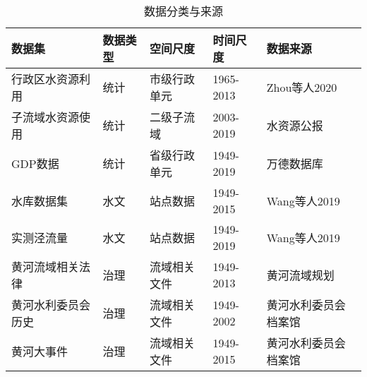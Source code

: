 \begin{table}[htbp]
    \centering
    \caption{数据分类与来源}
      \begin{tabularx}{\textwidth}{LLLLL}
      \toprule
      数据集   & 数据类型  & 空间尺度  & 时间尺度  & 数据来源 \\
      \midrule
      行政区水资源利用 & 统计    & 市级行政单元 & 1965-2013 & Zhou等人2020 \\
      子流域水资源使用 & 统计    & 二级子流域 & 2003-2019 & 水资源公报 \\
      GDP数据 & 统计    & 省级行政单元 & 1949-2019 & 万德数据库 \\
      水库数据集 & 水文    & 站点数据  & 1949-2015 & Wang等人2019 \\
      实测泾流量 & 水文    & 站点数据  & 1949-2019 & Wang等人2019 \\
      黄河流域相关法律 & 治理    & 流域相关文件 & 1949-2013 & 黄河流域规划 \\
      黄河水利委员会历史 & 治理    & 流域相关文件 & 1949-2002 & 黄河水利委员会档案馆 \\
      黄河大事件 & 治理    & 流域相关文件 & 1949-2015 & 黄河水利委员会档案馆 \\
      \bottomrule
      \end{tabularx}%
    \label{ch4:tab:data_source}%
\end{table}%
  